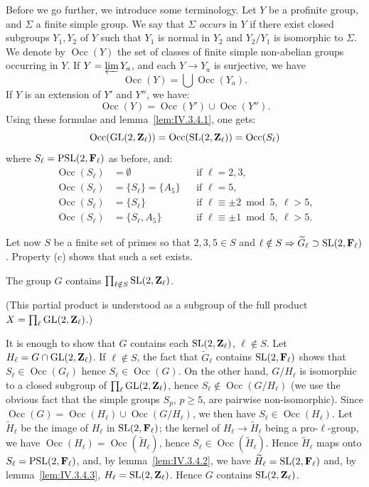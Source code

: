 Before we go further, we introduce some terminology. Let $Y$ be a profinite group, and $\Sigma$ a finite simple group. We say that $\Sigma$ \emph{occurs} in $Y$ if there exist closed subgroups $Y_1, Y_2$ of $Y$ such that $Y_1$ is normal in $Y_2$ and $Y_2/Y_1$ is isomorphic to $\Sigma$. We denote by $\operatorname{Occ}(Y)$ the set of classes of finite simple non-abelian groups occurring in $Y$. If $Y = \varprojlim Y_a$, and each $Y \to Y_a$ is surjective, we have
\[
  \operatorname{Occ}(Y) = \bigcup \operatorname{Occ}(Y_a).
\]
If $Y$ is an extension of $Y'$ and $Y''$, we have:
\[
  \operatorname{Occ}(Y) = \operatorname{Occ}(Y') \cup \operatorname{Occ}(Y'').
\]
Using these formulae and lemma~\ref{lem:IV.3.4.1}, one gets:
\[
  \operatorname{Occ}(\mathrm{GL}(2,\mathbf{Z}_\ell)) = \operatorname{Occ}(\mathrm{SL}(2,\mathbf{Z}_\ell)) = \operatorname{Occ}(S_\ell)
\]
where $S_\ell = \mathrm{PSL}(2,\mathbf{F}_\ell)$ as before, and:
\begin{align*}
  \operatorname{Occ}(S_\ell) &= \emptyset &&\text{if } \ell = 2,3, \\
  \operatorname{Occ}(S_\ell) &= \{S_\ell\} = \{A_5\} &&\text{if } \ell = 5, \\
  \operatorname{Occ}(S_\ell) &= \{S_\ell\} &&\text{if } \ell \equiv \pm 2 \bmod 5,\ \ell > 5, \\
  \operatorname{Occ}(S_\ell) &= \{S_\ell, A_5\} &&\text{if } \ell \equiv \pm 1 \bmod 5,\ \ell > 5.
\end{align*}

Let now $S$ be a finite set of primes so that $2,3,5 \in S$ and $\ell \notin S \Rightarrow \widetilde{G}_\ell \supset \mathrm{SL}(2,\mathbf{F}_\ell)$. Property (c) shows that such a set exists.

\begin{lemma}[5]\label{lem:IV.3.4.5}
The group $G$ contains $\prod_{\ell \notin S} \mathrm{SL}(2,\mathbf{Z}_\ell)$.
\end{lemma}

(This partial product is understood as a subgroup of the full product $X = \prod_{\ell} \mathrm{GL}(2,\mathbf{Z}_\ell)$.)

It is enough to show that $G$ contains each $\mathrm{SL}(2,\mathbf{Z}_\ell)$, $\ell \notin S$. Let $H_\ell = G \cap \mathrm{GL}(2,\mathbf{Z}_\ell)$. If $\ell \notin S$, the fact that $\widetilde{G}_\ell$ contains $\mathrm{SL}(2,\mathbf{F}_\ell)$ shows that $S_\ell \in \operatorname{Occ}(G_\ell)$ hence $S_\ell \in \operatorname{Occ}(G)$. On the other hand, $G/H_\ell$ is isomorphic to a closed subgroup of $\prod_{\ell} \mathrm{GL}(2,\mathbf{Z}_\ell)$, hence $S_\ell \notin \operatorname{Occ}(G/H_\ell)$ (we use the obvious fact that the simple groups $S_p$, $p \geq 5$, are pairwise non-isomorphic). Since $\operatorname{Occ}(G) = \operatorname{Occ}(H_\ell) \cup \operatorname{Occ}(G/H_\ell)$, we then have $S_\ell \in \operatorname{Occ}(H_\ell)$. Let $\widetilde{H}_\ell$ be the image of $H_\ell$ in $\mathrm{SL}(2,\mathbf{F}_\ell)$; the kernel of $H_\ell \to \widetilde{H}_\ell$ being a pro-$\ell$-group, we have $\operatorname{Occ}(H_\ell) = \operatorname{Occ}(\widetilde{H}_\ell)$, hence $S_\ell \in \operatorname{Occ}(\widetilde{H}_\ell)$. Hence $\widetilde{H}_\ell$ maps onto $S_\ell = \mathrm{PSL}(2,\mathbf{F}_\ell)$, and, by lemma~\ref{lem:IV.3.4.2}, we have $\widetilde{H}_\ell = \mathrm{SL}(2,\mathbf{F}_\ell)$ and, by lemma~\ref{lem:IV.3.4.3}, $H_\ell = \mathrm{SL}(2,\mathbf{Z}_\ell)$. Hence $G$ contains $\mathrm{SL}(2,\mathbf{Z}_\ell)$.

